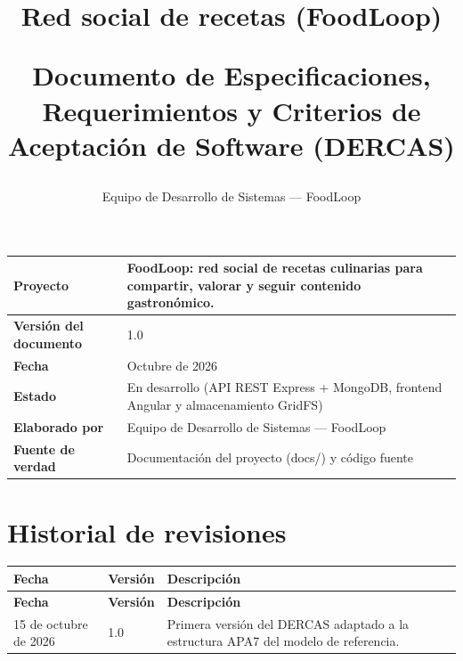 \documentclass[doc,12pt,a4paper]{apa7}
\begin{document}
\title{Red social de recetas (FoodLoop)\par
Documento de Especificaciones, Requerimientos y Criterios de Aceptación de Software (DERCAS)}
\author{Equipo de Desarrollo de Sistemas --- FoodLoop}

\maketitle
\thispagestyle{otherpage}

\vspace*{1\baselineskip}
\noindent
\begin{tabular}{@{}P{4.2cm} L{9.5cm}@{}}
\toprule
\textbf{Proyecto} & FoodLoop: red social de recetas culinarias para compartir, valorar y seguir contenido gastronómico. \\
\midrule
\textbf{Versión del documento} & 1.0 \\
\midrule
\textbf{Fecha} & Octubre de 2026 \\
\midrule
\textbf{Estado} & En desarrollo (API REST Express + MongoDB, frontend Angular y almacenamiento GridFS) \\
\midrule
\textbf{Elaborado por} & Equipo de Desarrollo de Sistemas --- FoodLoop \\
\midrule
\textbf{Fuente de verdad} & Documentación del proyecto (docs/) y código fuente \\
\bottomrule
\end{tabular}

\newpage

\section*{Historial de revisiones}

\begin{longtable}{|P{2.5cm}|P{2cm}|L{10.5cm}|}
\hline
\textbf{Fecha} & \textbf{Versión} & \textbf{Descripción} \\ \hline
\endfirsthead
\hline
\textbf{Fecha} & \textbf{Versión} & \textbf{Descripción} \\ \hline
\endhead
\hline
\endfoot

15 de octubre de 2026 & 1.0 & Primera versión del DERCAS adaptado a la estructura APA7 del modelo de referencia. \\ \hline
\end{longtable}
\end{document}
